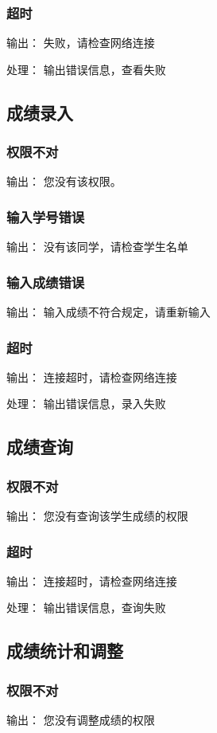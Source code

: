 \subsubsection{超时}
输出： 失败，请检查网络连接

处理： 输出错误信息，查看失败

\subsection{成绩录入}
\subsubsection{权限不对}
输出： 您没有该权限。
\subsubsection{输入学号错误}
输出： 没有该同学，请检查学生名单
\subsubsection{输入成绩错误}
输出： 输入成绩不符合规定，请重新输入
\subsubsection{超时}
输出： 连接超时，请检查网络连接

处理： 输出错误信息，录入失败

\subsection{成绩查询}
\subsubsection{权限不对}
输出： 您没有查询该学生成绩的权限
\subsubsection{超时}
输出： 连接超时，请检查网络连接

处理： 输出错误信息，查询失败


\subsection{成绩统计和调整}
\subsubsection{权限不对}
输出： 您没有调整成绩的权限
